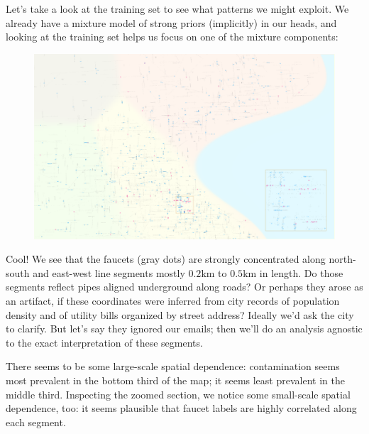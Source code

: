 \documentclass[11pt, justified]{tufte-book}
\theoremstyle{definition}
\begin{document}
        Let's take a look at the training set to see what patterns we might
        exploit.  We already have a mixture model of strong priors (implicitly)
        in our heads, and looking at the training set helps us focus on one of
        the mixture components:
        \begin{figure}[h]
          \centering
          \includegraphics[width=\textwidth]{hei}
        \end{figure}

      \pagebreak
        Cool! We see that the faucets (gray dots) are strongly concentrated
        along north-south and east-west line segments mostly $0.2\text{km}$ to
        $0.5\text{km}$ in length.  Do those segments reflect pipes aligned
        underground along roads?  Or perhaps they arose as an artifact, if
        these coordinates were inferred from city records of population density
        and of utility bills organized by street address?  Ideally we'd ask the
        city to clarify.  But let's say they ignored our emails; then we'll do
        an analysis agnostic to the exact interpretation of these segments.

        There seems to be some large-scale spatial dependence: contamination
        seems most prevalent in the bottom third of the map; it seems
        least prevalent in the middle third.
        Inspecting the zoomed section, we notice some small-scale spatial
        dependence, too: it seems plausible that faucet labels are highly
        correlated along each segment.
\end{document}
